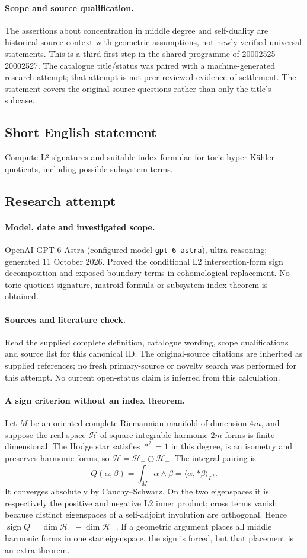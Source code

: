 \documentclass[11pt]{article}
\begin{document}
\paragraph{Scope and source qualification.}The assertions about concentration in middle degree and self-duality are historical source context with geometric assumptions, not newly verified universal statements. This is a third first step in the shared programme of 20002525–20002527. The catalogue title/status was paired with a machine-generated research attempt; that attempt is not peer-reviewed evidence of settlement. The statement covers the original source questions rather than only the title’s subcase.
\subsection{Short English statement}
Compute L² signatures and suitable index formulae for toric hyper-Kähler quotients, including possible subsystem terms.
\subsection{Research attempt}
\paragraph{Model, date and investigated scope.}
OpenAI GPT-6 Astra (configured model \texttt{gpt-6-astra}), ultra reasoning; generated 11 October 2026. Proved the conditional L2 intersection-form sign decomposition and exposed boundary terms in cohomological replacement. No toric quotient signature, matroid formula or subsystem index theorem is obtained.

\paragraph{Sources and literature check.}
Read the supplied complete definition, catalogue wording, scope qualifications and source list for this canonical ID. The original-source citations are inherited as supplied references; no fresh primary-source or novelty search was performed for this attempt. No current open-status claim is inferred from this calculation.

\paragraph{A sign criterion without an index theorem.}Let \(M\) be an oriented complete Riemannian manifold of dimension \(4m\), and suppose the real space \(\mathcal H\) of square-integrable harmonic \(2m\)-forms is finite dimensional. The Hodge star satisfies \(*^2=1\) in this degree, is an isometry and preserves harmonic forms, so \(\mathcal H=\mathcal H_+\oplus\mathcal H_-\). The integral pairing is
\[Q(\alpha,\beta)=\int_M\alpha\wedge\beta=\langle\alpha,*\beta\rangle_{L^2}.
\]
It converges absolutely by Cauchy--Schwarz. On the two eigenspaces it is respectively the positive and negative L2 inner product; cross terms vanish because distinct eigenspaces of a self-adjoint involution are orthogonal. Hence \(\operatorname{sign}Q=\dim\mathcal H_+-\dim\mathcal H_-\). If a geometric argument places all middle harmonic forms in one star eigenspace, the sign is forced, but that placement is an extra theorem.
\end{document}

